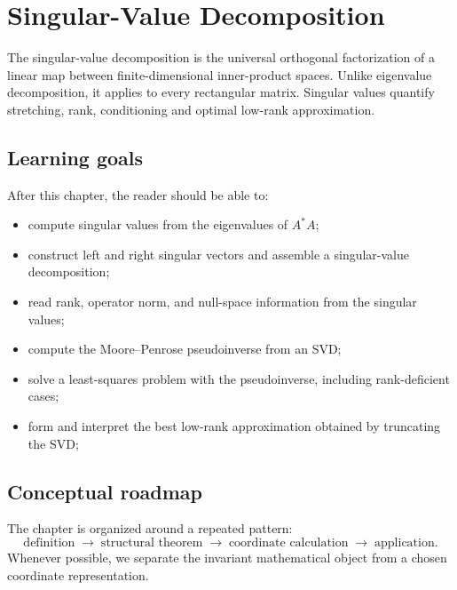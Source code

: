 \chapter{Singular-Value Decomposition}
\label{ch:i18-singular-value-decomposition}

The singular-value decomposition is the universal orthogonal factorization of a linear map between finite-dimensional inner-product spaces. Unlike eigenvalue decomposition, it applies to every rectangular matrix. Singular values quantify stretching, rank, conditioning and optimal low-rank approximation.

\section*{Learning goals}
After this chapter, the reader should be able to:
\begin{itemize}
\item compute singular values from the eigenvalues of \(A^*A\);
\item construct left and right singular vectors and assemble a singular-value decomposition;
\item read rank, operator norm, and null-space information from the singular values;
\item compute the Moore--Penrose pseudoinverse from an SVD;
\item solve a least-squares problem with the pseudoinverse, including rank-deficient cases;
\item form and interpret the best low-rank approximation obtained by truncating the SVD;
\end{itemize}
\section*{Conceptual roadmap}
The chapter is organized around a repeated pattern:
\[
\boxed{\text{definition}\;\longrightarrow\;\text{structural theorem}\;\longrightarrow\;\text{coordinate calculation}\;\longrightarrow\;\text{application}.}
\]
Whenever possible, we separate the invariant mathematical object from a chosen coordinate representation.


